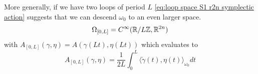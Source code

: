 \documentclass[../main-v2-manifolds.tex]{subfiles}
\begin{document}
%
%
%
\begin{remark}
    More generally, if we have two loops of period $L$ \cref{eq:loop space S1 r2n symplectic action} suggests that we can descend $\omega_0$ to an even larger space.
    \begin{equation}
        \Omega_{[0,L]} = C^\infty(\mathbb{R}/L\mathbb{Z}, {\mathbb{R}^{2n}})
        \label{eq:[0,L] r2n space}
    \end{equation}
    with $A_{[0,L]}(\gamma,\eta) = A(\gamma(Lt),\eta(Lt))$ which evaluates to
    \begin{equation}
     A_{[0,L]}(\gamma,\eta) = \frac{1}{2L}\int_{0}^{L}\langle \mathring{\gamma}(t),\eta(t)\rangle_{\omega_0}dt
     \label{eq:[0,L] r2n symplectic action}
    \end{equation}
\end{remark}
\end{document}
